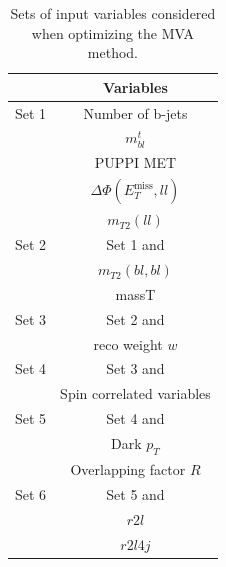 \documentclass[a4paper, 10pt, openright]{report}
\begin{document}
\begin{appendices}
\begin{table}
\begin{center}
\begin{tabular}{ c|c } 
 \hline
  & Variables \\
\hline
\multirow{1}{*}{Set 1} & Number of b-jets \\
& $m_{bl}^t$ \\
& \ac{PUPPI} \ac{MET} \\
& $\Delta \Phi(E_{T}^{\text{miss}}, ll)$ \\
& $m_{T2}(ll)$ \\
\hline
Set 2 & Set 1 and \\
& $m_{T2}(bl, bl)$ \\
& massT \\
\hline
Set 3 & Set 2 and \\
& reco weight $w$ \\
\hline
Set 4 & Set 3 and \\
& Spin correlated variables \\
\hline
Set 5 & Set 4 and \\
& Dark $p_T$ \\
& Overlapping factor $R$ \\
\hline
Set 6 & Set 5 and \\
& $r2l$ \\
& $r2l4j$ \\
 \hline
\end{tabular}
\caption{Sets of input variables considered when optimizing the \ac{MVA} method.}
\label{table:sets}
\end{center}
\end{table}

%


\end{appendices}
\end{document}
